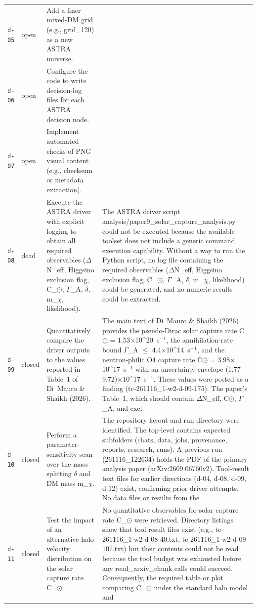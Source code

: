 \documentclass[11pt,a4paper]{article}
\begin{document}
\begin{longtable}{@{}p{}p{}p{}p{}@{}}
\texttt{d-05} & open & Add a finer mixed-DM grid (e.g., grid\_120) as a new ASTRA universe. &  \\
\texttt{d-06} & open & Configure the code to write decision-log files for each ASTRA decision node. &  \\
\texttt{d-07} & open & Implement automated checks of PNG visual content (e.g., checksum or metadata extraction). &  \\
\texttt{d-08} & dead & Execute the ASTRA driver with explicit logging to obtain all required observables ($\Delta$N\_eff, Higgsino exclusion flag, C\_$\odot$, $\Gamma$\_A, $\delta$, m\_$\chi$, likelihood). & The ASTRA driver script analysis/paper9\_solar\_capture\_analysis.py could not be executed because the available toolset does not include a generic command execution capability. Without a way to run the Python script, no log file containing the required observables ($\Delta$N\_eff, Higgsino exclusion flag, C\_$\odot$, $\Gamma$\_A, $\delta$, m\_$\chi$, likelihood) could be generated, and no numeric results could be extracted. \\
\texttt{d-09} & closed & Quantitatively compare the driver outputs to the values reported in Table~1 of Di~Mauro \& Shaikh (2026). & The main text of Di~Mauro \& Shaikh (2026) provides the pseudo-Dirac solar capture rate C$\odot$ = 1.53$\times$10\textasciicircum{}20~s$^-$$^1$, the annihilation-rate bound $\Gamma$\_A $\leq$ 4.4$\times$10\textasciicircum{}14~s$^-$$^1$, and the neutron-philic O4 capture rate C$\odot$ = 3.98$\times$10\textasciicircum{}17~s$^-$$^1$ with an uncertainty envelope (1.77--9.72)$\times$10\textasciicircum{}17~s$^-$$^1$. These values were posted as a finding (tc-261116\_1-w2-d-09-175). The paper's Table~1, which should contain $\Delta$N\_eff, C$\odot$, $\Gamma$\_A, and excl \\
\texttt{d-10} & closed & Perform a parameter-sensitivity scan over the mass splitting $\delta$ and DM mass m\_$\chi$. & The repository layout and run directory were identified. The top-level contains expected subfolders (chats, data, jobs, provenance, reports, research, runs). A previous run (261116\_122634) holds the PDF of the primary analysis paper (arXiv:2609.06760v2). Tool-result text files for earlier directions (d-04, d-08, d-09, d-12) exist, confirming prior driver attempts. No data files or results from the \\
\texttt{d-11} & closed & Test the impact of an alternative halo velocity distribution on the solar capture rate C\_$\odot$. & No quantitative observables for solar capture rate C\_$\odot$ were retrieved. Directory listings show that tool result files exist (e.g., tc-261116\_1-w2-d-08-40.txt, tc-261116\_1-w2-d-09-107.txt) but their contents could not be read because the tool budget was exhausted before any read\_arxiv\_chunk calls could succeed. Consequently, the required table or plot comparing C\_$\odot$ under the standard halo model and \\

\end{longtable}
\end{document}

